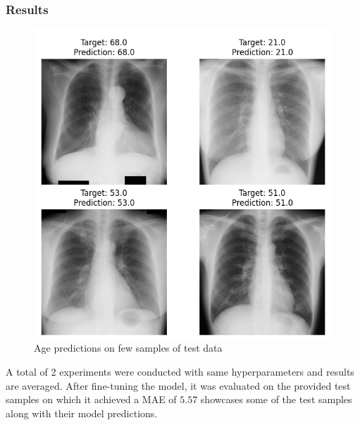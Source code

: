 \subsubsection{Results}

    \begin{figure}[!htbp]
        \centering
        \includegraphics[width=\linewidth]{../outputs/age/age1/test-results-cropped.png}
        \caption{Age predictions on few samples of test data}
        \label{fig:age-results}
    \end{figure} 

    A total of 2 experiments were conducted with same hyperparameters and results are averaged. After fine-tuning the model, it was evaluated on the provided test samples on which it achieved a MAE of $5.57$  showcases some of the test samples along with their model predictions.
